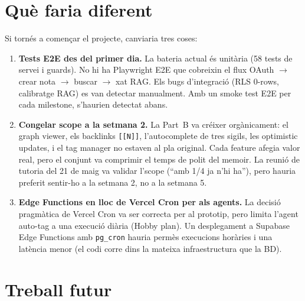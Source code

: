 \section{Què faria diferent}

Si tornés a començar el projecte, canviaria tres coses:

\begin{enumerate}
    \item \textbf{Tests E2E des del primer dia.} La bateria actual és unitària (58 tests de servei i guards). No hi ha Playwright E2E que cobreixin el flux OAuth $\rightarrow$ crear nota $\rightarrow$ buscar $\rightarrow$ xat RAG. Els bugs d'integració (RLS 0-rows, calibratge RAG) es van detectar manualment. Amb un smoke test E2E per cada milestone, s'haurien detectat abans.

    \item \textbf{Congelar scope a la setmana 2.} La Part~B va créixer orgànicament: el graph viewer, els backlinks \texttt{[[N]]}, l'autocomplete de tres sigils, les optimistic updates, i el tag manager no estaven al pla original. Cada feature afegia valor real, pero el conjunt va comprimir el temps de polit del memoir. La reunió de tutoria del 21 de maig va validar l'scope (``amb 1/4 ja n'hi ha''), pero hauria preferit sentir-ho a la setmana 2, no a la setmana 5.

    \item \textbf{Edge Functions en lloc de Vercel Cron per als agents.} La decisió pragmàtica de Vercel Cron va ser correcta per al prototip, pero limita l'agent auto-tag a una execució diària (Hobby plan). Un desplegament a Supabase Edge Functions amb \texttt{pg\_cron} hauria permès execucions horàries i una latència menor (el codi corre dins la mateixa infraestructura que la BD).
\end{enumerate}

\section{Treball futur}

